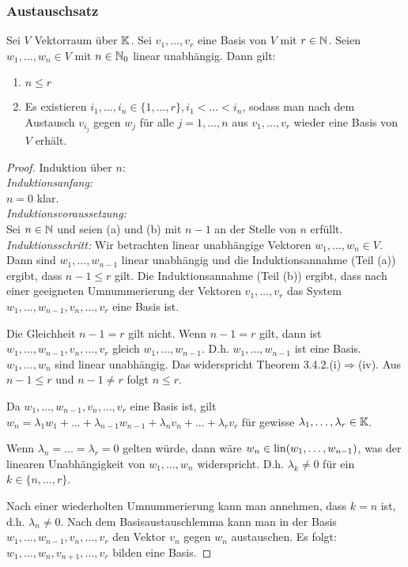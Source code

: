 \subsubsection{Austauschsatz}

\begin{thm}
	Sei $ V $ Vektorraum über $ \mathbb K $. Sei $ v_1, \ldots, v_r $ eine Basis von $ V $ mit $ r \in \mathbb N $. Seien $ w_1, \ldots, w_n \in V $ mit $ n \in \mathbb N_0 $ linear unabhängig. Dann gilt:
	\begin{enumerate}[label=\normalfont(\alph*)]
		\item $ n \leq r $
		\item Es existieren $ i_1, \ldots, i_n \in \{ 1, \ldots, r \}, i_1 < \ldots < i_n $, sodass man nach dem Austausch $ v_{i_j} $ gegen $ w_j $ für alle $ j = 1, \ldots, n $ aus $ v_1, \ldots, v_r $ wieder eine Basis von $ V $ erhält.
	\end{enumerate}
\end{thm}
\begin{proof}
	Induktion über $ n $:\\[10pt]
	\emph{Induktionsanfang:}\\$ n = 0 $ klar.\\[10pt]
	\emph{Induktionsvoraussetzung:}\\Sei $ n \in \mathbb N $ und seien (a) und (b) mit $ n-1 $ an der Stelle von $ n $ erfüllt.\\[10pt]
	\emph{Induktionsschritt:} Wir betrachten linear unabhängige Vektoren $ w_1, \ldots, w_n \in V $. Dann sind $ w_1, \ldots, w_{n-1} $ linear unabhängig und die Induktionsannahme (Teil (a)) ergibt, dass $ n-1 \leq r $ gilt. Die Induktionsannahme (Teil (b)) ergibt, dass nach einer geeigneten Umnummerierung der Vektoren $ v_1, \ldots, v_r $ das System $ w_1, \ldots, w_{n-1}, v_n, \ldots, v_r $ eine Basis ist.
	
	Die Gleichheit $ n-1 = r $ gilt nicht. Wenn $ n-1 = r $ gilt, dann ist $ w_1, \ldots, w_{n-1}, v_n, \ldots, v_r $ gleich $ w_1, \ldots, w_{n-1} $. D.h. $ w_1, \ldots, w_{n-1} $ ist eine Basis. $ w_1, \ldots, w_n $ sind linear unabhängig. Das widerspricht Theorem 3.4.2.(i)$ \Rightarrow $(iv). Aus $ n-1 \leq r $ und $ n-1 \neq r $ folgt $ n \leq r $.
	
	Da $ w_1, \ldots, w_{n-1}, v_n, \ldots, v_r $ eine Basis ist, gilt $ w_n = \lambda_1w_1 + \ldots + \lambda_{n-1}w_{n-1} + \lambda_nv_n + \ldots + \lambda_rv_r $ für gewisse $ \lambda_1, \ldots, \lambda_r \in \mathbb K $.
	
	Wenn $ \lambda_n = \ldots = \lambda_r = 0 $ gelten würde, dann wäre $ w_n \in \operatorname{lin}(w_1, \ldots, w_{n-1}) $, was der linearen Unabhängigkeit von $ w_1, \ldots, w_n $ widerspricht. D.h. $ \lambda_k \neq 0 $ für ein $ k \in \{ n, \ldots, r \} $.
	
	Nach einer wiederholten Umnummerierung kann man annehmen, dass $ k = n $ ist, d.h. $ \lambda_n \neq 0 $. Nach dem Basisaustauschlemma kann man in der Basis $ w_1, \ldots, w_{n-1}, v_n, \ldots, v_r $ den Vektor $ v_n $ gegen $ w_n $ austauschen. Es folgt: $ w_1, \ldots, w_n, v_{n+1}, \ldots, v_r $ bilden eine Basis.
\end{proof}

